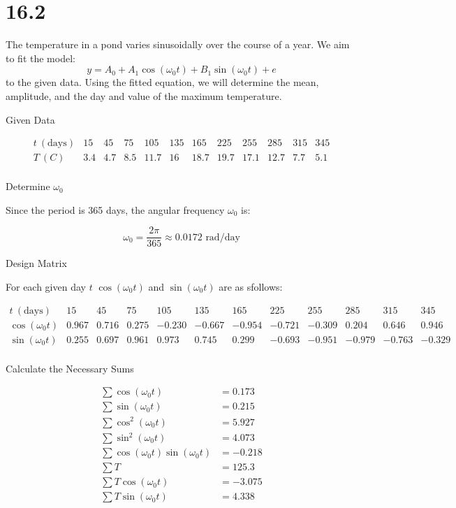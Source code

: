 \documentclass[12pt]{article}
\begin{document}
\section{16.2}
The temperature in a pond varies sinusoidally over the course of a year. We aim to fit the model:
\[
y = A_0 + A_1 \cos(\omega_0 t) + B_1 \sin(\omega_0 t) + e
\]
to the given data. Using the fitted equation, we will determine the mean, amplitude, and the day and value of the maximum temperature.

Given Data

\[
\begin{array}{c|ccccccccccc}
t \ (\text{days}) & 15 & 45 & 75 & 105 & 135 & 165 & 225 & 255 & 285 & 315 & 345 \\
\hline
T \ (C) & 3.4 & 4.7 & 8.5 & 11.7 & 16 & 18.7 & 19.7 & 17.1 & 12.7 & 7.7 & 5.1 \\
\end{array}
\]

Determine \(\omega_0\)

Since the period is 365 days, the angular frequency \(\omega_0\) is:

\[
\omega_0 = \frac{2\pi}{365} \approx 0.0172 \text{ rad/day}
\]

Design Matrix

For each given day \( t \)  \( \cos(\omega_0 t) \) and \( \sin(\omega_0 t) \) are as sfollows: 

\[
\begin{array}{c|ccccccccccc}
t \ (\text{days}) & 15 & 45 & 75 & 105 & 135 & 165 & 225 & 255 & 285 & 315 & 345 \\
\hline
\cos(\omega_0 t) & 0.967 & 0.716 & 0.275 & -0.230 & -0.667 & -0.954 & -0.721 & -0.309 & 0.204 & 0.646 & 0.946 \\
\sin(\omega_0 t) & 0.255 & 0.697 & 0.961 & 0.973 & 0.745 & 0.299 & -0.693 & -0.951 & -0.979 & -0.763 & -0.329 \\
\end{array}
\]

Calculate the Necessary Sums

\[
\begin{aligned}
\sum \cos(\omega_0 t) &= 0.173 \\
\sum \sin(\omega_0 t) &= 0.215 \\
\sum \cos^2(\omega_0 t) &= 5.927 \\
\sum \sin^2(\omega_0 t) &= 4.073 \\
\sum \cos(\omega_0 t) \sin(\omega_0 t) &= -0.218 \\
\sum T &= 125.3 \\
\sum T \cos(\omega_0 t) &= -3.075 \\
\sum T \sin(\omega_0 t) &= 4.338 \\
\end{aligned}
\]
\end{document}
